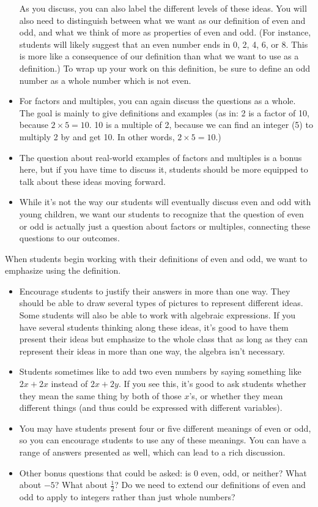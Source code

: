 \documentclass{ximera}
\begin{document}
\begin{instructorNotes}
\begin{itemize}
As you discuss, you can also label the different levels of these ideas. You will also need to distinguish between what we want as our definition of even and odd, and what we think of more as properties of even and odd. (For instance, students will likely suggest that an even number ends in 0, 2, 4, 6, or 8. This is more like a consequence of our definition than what we want to use as a definition.) To wrap up your work on this definition, be sure to define an odd number as a whole number which is not even.
\item For factors and multiples, you can again discuss the questions as a whole. The goal is mainly to give definitions and examples (as in: 2 is a factor of 10, because $2 \times 5 = 10$. 10 is a multiple of 2, because we can find an integer (5) to multiply 2 by and get 10. In other words, $2 \times 5 = 10$.)
\item The question about real-world examples of factors and multiples is a bonus here, but if you have time to discuss it, students should be more equipped to talk about these ideas moving forward.
\item While it's not the way our students will eventually discuss even and odd with young children, we want our students to recognize that the question of even or odd is actually just a question about factors or multiples, connecting these questions to our outcomes.
\end{itemize}


When students begin working with their definitions of even and odd, we want to emphasize using the definition.
\begin{itemize}
	\item Encourage students to justify their answers in more than one way. They should be able to draw several types of pictures to represent different ideas. Some students will also be able to work with algebraic expressions. If you have several students thinking along these ideas, it's good to have them present their ideas but emphasize to the whole class that as long as they can represent their ideas in more than one way, the algebra isn't necessary.
	\item Students sometimes like to add two even numbers by saying something like $2x + 2x$ instead of $2x + 2y$. If you see this, it's good to ask students whether they mean the same thing by both of those $x$'s, or whether they mean different things (and thus could be expressed with different variables).
	\item You may have students present four or five different meanings of even or odd, so you can encourage students to use any of these meanings. You can have a range of answers presented as well, which can lead to a rich discussion. 
	\item Other bonus questions that could be asked: is $0$ even, odd, or neither? What about $-5$? What about $\frac{1}{2}$? Do we need to extend our definitions of even and odd to apply to integers rather than just whole numbers?
\end{itemize}





\end{instructorNotes}
\end{document}
